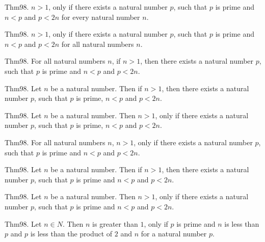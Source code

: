 \documentclass{article}
\begin{document}
Thm98. $n > 1$, only if there exists a natural number $p$, such that $p$ is prime and $n < p$ and $p < 2 n$ for every natural number $n$.

Thm98. $n > 1$, only if there exists a natural number $p$, such that $p$ is prime and $n < p$ and $p < 2 n$ for all natural numbers $n$.

Thm98. For all natural numbers $n$, if $n > 1$, then there exists a natural number $p$, such that $p$ is prime and $n < p$ and $p < 2 n$.

Thm98. Let $n$ be a natural number. Then if $n > 1$, then there exists a natural number $p$, such that $p$ is prime, $n < p$ and $p < 2 n$.

Thm98. Let $n$ be a natural number. Then $n > 1$, only if there exists a natural number $p$, such that $p$ is prime, $n < p$ and $p < 2 n$.

Thm98. For all natural numbers $n$, $n > 1$, only if there exists a natural number $p$, such that $p$ is prime and $n < p$ and $p < 2 n$.

Thm98. Let $n$ be a natural number. Then if $n > 1$, then there exists a natural number $p$, such that $p$ is prime and $n < p$ and $p < 2 n$.

Thm98. Let $n$ be a natural number. Then $n > 1$, only if there exists a natural number $p$, such that $p$ is prime and $n < p$ and $p < 2 n$.

Thm98. Let $n \in N$. Then $n$ is greater than $1$, only if $p$ is prime and $n$ is less than $p$ and $p$ is less than the product of $2$ and $n$ for a natural number $p$.
\end{document}
